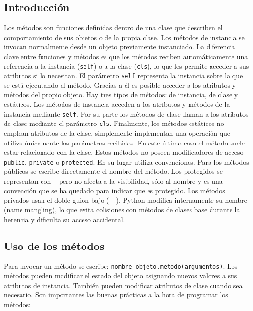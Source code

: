 \documentclass[11pt,a5paper,twoside]{book}
\begin{document}
\subsection{Introducción}
Los métodos son funciones definidas dentro de una clase que describen el comportamiento de sus objetos o de la propia clase. Los métodos de instancia se invocan normalmente desde un objeto previamente instanciado.
La diferencia clave entre funciones y métodos es que los métodos reciben automáticamente una referencia a la instancia ({\scriptsize \texttt{self}}) o a la clase ({\scriptsize \texttt{cls}}), lo que les permite acceder a sus atributos si lo necesitan.
El parámetro {\scriptsize \texttt{self}} representa la instancia sobre la que se está ejecutando el método. Gracias a él es posible acceder a los atributos y métodos del propio objeto.
Hay tres tipos de métodos: de instancia, de clase y estáticos. Los métodos de instancia acceden a los atributos y métodos de la instancia mediante {\scriptsize \texttt{self}}. Por su parte los métodos de clase llaman a los atributos de clase mediante el parámetro {\scriptsize \texttt{cls}}. Finalmente, los métodos estáticos no emplean atributos de la clase, simplemente implementan una operación que utiliza únicamente los parámetros recibidos. En este último caso el método suele estar relacionado con la clase.
Estos métodos no poseen modificadores de acceso {\scriptsize \texttt{public}}, {\scriptsize \texttt{private}} o {\scriptsize \texttt{protected}}. En su lugar utiliza convenciones. Para los métodos públicos se escribe directamente el nombre del método. Los protegidos se representan con {\scriptsize \texttt{\_}} pero no afecta a la visibilidad, sólo al nombre y es una convención que se ha quedado para indicar que es protegido. Los métodos privados usan el doble guion bajo ({\scriptsize \texttt{\_\_}}). Python modifica internamente su nombre (name mangling), lo que evita colisiones con métodos de clases base durante la herencia y dificulta su acceso accidental.
\subsection{Uso de los métodos}
Para invocar un método se escribe: {\scriptsize \texttt{nombre\_objeto.metodo(argumentos)}}. Los métodos pueden modificar el estado del objeto asignando nuevos valores a sus atributos de instancia. También pueden modificar atributos de clase cuando sea necesario.
Son importantes las buenas prácticas a la hora de programar los métodos:
\end{document}
